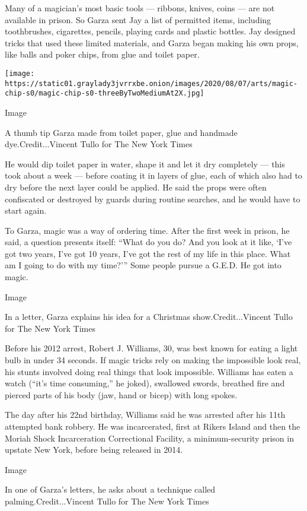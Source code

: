 Many of a magician's most basic tools --- ribbons, knives, coins --- are
not available in prison. So Garza sent Jay a list of permitted items,
including toothbrushes, cigarettes, pencils, playing cards and plastic
bottles. Jay designed tricks that used these limited materials, and
Garza began making his own props, like balls and poker chips, from glue
and toilet paper.

\texttt{[image: https://static01.graylady3jvrrxbe.onion/images/2020/08/07/arts/magic-chip-s0/magic-chip-s0-threeByTwoMediumAt2X.jpg]}

Image

A thumb tip Garza made from toilet paper, glue and handmade
dye.Credit...Vincent Tullo for The New York Times

He would dip toilet paper in water, shape it and let it dry completely
--- this took about a week --- before coating it in layers of glue, each
of which also had to dry before the next layer could be applied. He said
the props were often confiscated or destroyed by guards during routine
searches, and he would have to start again.

To Garza, magic was a way of ordering time. After the first week in
prison, he said, a question presents itself: ``What do you do? And you
look at it like, `I've got two years, I've got 10 years, I've got the
rest of my life in this place. What am I going to do with my time?'''
Some people pursue a G.E.D. He got into magic.

Image

In a letter, Garza explains his idea for a Christmas
show.Credit...Vincent Tullo for The New York Times

Before his 2012 arrest, Robert J. Williams, 30, was best known for
eating a light bulb in under 34 seconds. If magic tricks rely on making
the impossible look real, his stunts involved doing real things that
look impossible. Williams has eaten a watch (``it's time consuming,'' he
joked), swallowed swords, breathed fire and pierced parts of his body
(jaw, hand or bicep) with long spokes.

The day after his 22nd birthday, Williams said he was arrested after his
11th attempted bank robbery. He was incarcerated, first at Rikers Island
and then the Moriah Shock Incarceration Correctional Facility, a
minimum-security prison in upstate New York, before being released in
2014.

Image

In one of Garza's letters, he asks about a technique called
palming.Credit...Vincent Tullo for The New York Times

